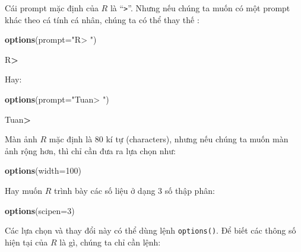 \documentclass[
]{book}
\newenvironment{Shaded}{\begin{snugshade}}{\end{snugshade}}
\newcommand{\DataTypeTok}[1]{\textcolor[rgb]{0.13,0.29,0.53}{#1}}
\newcommand{\DecValTok}[1]{\textcolor[rgb]{0.00,0.00,0.81}{#1}}
\newcommand{\KeywordTok}[1]{\textcolor[rgb]{0.13,0.29,0.53}{\textbf{#1}}}
\newcommand{\NormalTok}[1]{#1}
\newcommand{\OperatorTok}[1]{\textcolor[rgb]{0.81,0.36,0.00}{\textbf{#1}}}
\newcommand{\StringTok}[1]{\textcolor[rgb]{0.31,0.60,0.02}{#1}}
\begin{document}
Cái prompt mặc định của \(R\) là ``\texttt{\textgreater{}}''. Nhưng nếu chúng ta muốn có một prompt khác theo cá tính cá nhân, chúng ta có thể thay thế :

\begin{Shaded}
\begin{Highlighting}[]
\KeywordTok{options}\NormalTok{(}\DataTypeTok{prompt=}\StringTok{"R\textgreater{} "}\NormalTok{)}
\end{Highlighting}
\end{Shaded}

\begin{Shaded}
\begin{Highlighting}[]
\NormalTok{R}\OperatorTok{\textgreater{}}
\end{Highlighting}
\end{Shaded}

Hay:

\begin{Shaded}
\begin{Highlighting}[]
\KeywordTok{options}\NormalTok{(}\DataTypeTok{prompt=}\StringTok{"Tuan\textgreater{} "}\NormalTok{)}
\end{Highlighting}
\end{Shaded}

\begin{Shaded}
\begin{Highlighting}[]
\NormalTok{Tuan}\OperatorTok{\textgreater{}}
\end{Highlighting}
\end{Shaded}

Màn ảnh \(R\) mặc định là 80 kí tự (characters), nhưng nếu chúng ta muốn màn ảnh rộng hơn, thì chỉ cần đưa ra lựa chọn như:

\begin{Shaded}
\begin{Highlighting}[]
\KeywordTok{options}\NormalTok{(}\DataTypeTok{width=}\DecValTok{100}\NormalTok{)}
\end{Highlighting}
\end{Shaded}

Hay muốn \(R\) trình bày các số liệu ở dạng 3 số thập phân:

\begin{Shaded}
\begin{Highlighting}[]
\KeywordTok{options}\NormalTok{(}\DataTypeTok{scipen=}\DecValTok{3}\NormalTok{)}
\end{Highlighting}
\end{Shaded}

Các lựa chọn và thay đổi này có thể dùng lệnh \texttt{options()}. Để biết các thông số hiện tại của \(R\) là gì, chúng ta chỉ cần lệnh:
\end{document}
